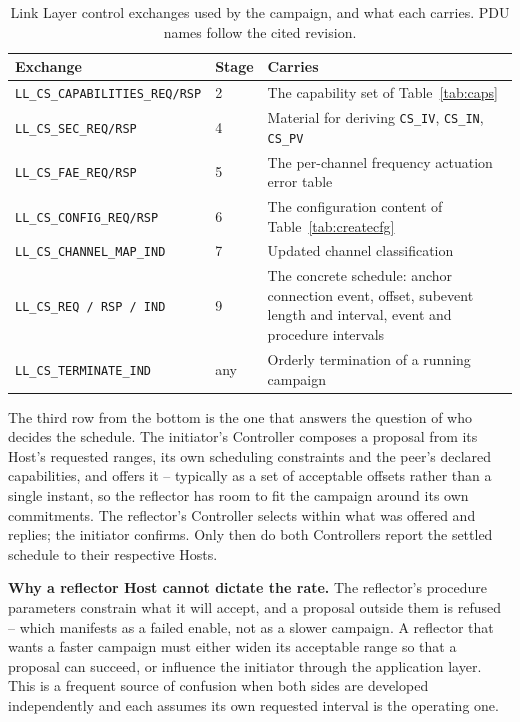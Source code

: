 \documentclass[11pt,a4paper]{article}
\newcommand{\code}[1]{\texttt{\small #1}}
\begin{document}
\begin{table}[h]
\caption{Link Layer control exchanges used by the campaign, and what each carries. PDU names follow
the cited revision.}
\label{tab:llcp}
\centering\small
\begin{tabular}{@{}L{44mm}L{40mm}L{52mm}@{}}
\toprule
Exchange & Stage & Carries \\
\midrule
\code{LL\_CS\_CAPABILITIES\_REQ/RSP} & 2 & The capability set of Table~\ref{tab:caps} \\
\code{LL\_CS\_SEC\_REQ/RSP} & 4 & Material for deriving \code{CS\_IV}, \code{CS\_IN}, \code{CS\_PV} \\
\code{LL\_CS\_FAE\_REQ/RSP} & 5 & The per-channel frequency actuation error table \\
\code{LL\_CS\_CONFIG\_REQ/RSP} & 6 & The configuration content of Table~\ref{tab:createcfg} \\
\code{LL\_CS\_CHANNEL\_MAP\_IND} & 7 & Updated channel classification \\
\code{LL\_CS\_REQ / RSP / IND} & 9 & The concrete schedule: anchor connection event, offset,
                                     subevent length and interval, event and procedure intervals \\
\code{LL\_CS\_TERMINATE\_IND} & any & Orderly termination of a running campaign \\
\bottomrule
\end{tabular}
\end{table}

The third row from the bottom is the one that answers the question of who decides the schedule. The
initiator's Controller composes a proposal from its Host's requested ranges, its own scheduling
constraints and the peer's declared capabilities, and offers it -- typically as a set of acceptable
offsets rather than a single instant, so the reflector has room to fit the campaign around its own
commitments. The reflector's Controller selects within what was offered and replies; the initiator
confirms. Only then do both Controllers report the settled schedule to their respective Hosts.

\begin{callout}
\textbf{Why a reflector Host cannot dictate the rate.} The reflector's procedure parameters constrain
what it will accept, and a proposal outside them is refused -- which manifests as a failed enable, not
as a slower campaign. A reflector that wants a faster campaign must either widen its acceptable range
so that a proposal can succeed, or influence the initiator through the application layer. This is a
frequent source of confusion when both sides are developed independently and each assumes its own
requested interval is the operating one.
\end{callout}
\end{document}
